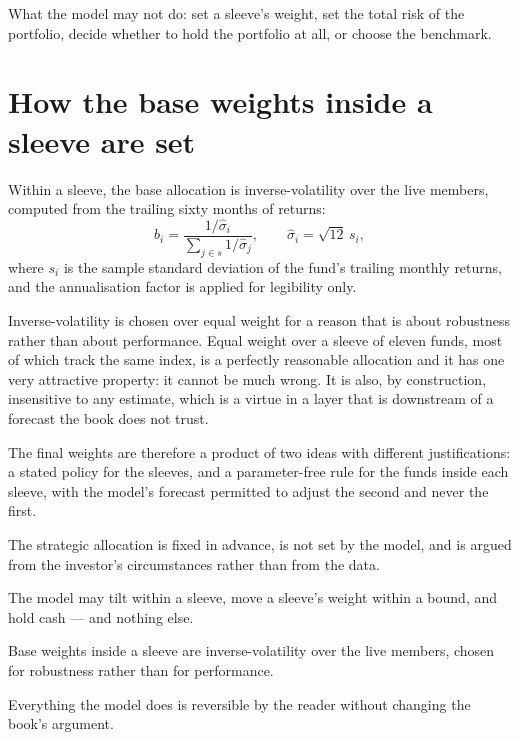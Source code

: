 What the model may not do: set a sleeve's weight, set the total risk of
the portfolio, decide whether to hold the portfolio at all, or choose the
benchmark.

\section{How the base weights inside a sleeve are set}

Within a sleeve, the base allocation is inverse-volatility over the live
members, computed from the trailing sixty months of returns:
\begin{equation}
b_{i} = \frac{1/\hat{\sigma}_i}{\sum_{j \in s} 1/\hat{\sigma}_j},
\qquad
\hat{\sigma}_i = \sqrt{12}\, s_i,
\end{equation}
where \(s_i\) is the sample standard deviation of the fund's trailing
monthly returns, and the annualisation factor is applied for legibility
only.

Inverse-volatility is chosen over equal weight for a reason that is about
robustness rather than about performance. Equal weight over a sleeve of
eleven funds, most of which track the same index, is a perfectly
reasonable allocation and it has one very attractive property: it cannot
be much wrong. It is also, by construction, insensitive to any estimate,
which is a virtue in a layer that is downstream of a forecast the book
does not trust.

The final weights are therefore a product of two ideas with different
justifications: a stated policy for the sleeves, and a parameter-free
rule for the funds inside each sleeve, with the model's forecast permitted
to adjust the second and never the first.

\begin{keytakeaways}
\item The strategic allocation is fixed in advance, is not set by the
model, and is argued from the investor's circumstances rather than from
the data.
\item The model may tilt within a sleeve, move a sleeve's weight within a
bound, and hold cash --- and nothing else.
\item Base weights inside a sleeve are inverse-volatility over the live
members, chosen for robustness rather than for performance.
\item Everything the model does is reversible by the reader without
changing the book's argument.
\end{keytakeaways}
